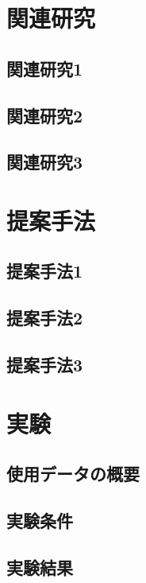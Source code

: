 \documentclass[11pt,a4j]{jreport}
\begin{document}


  \chapter{関連研究}
    \section{関連研究1}
    \section{関連研究2}
    \section{関連研究3}
  \newpage




  \chapter{提案手法}
    \section{提案手法1}
    \section{提案手法2}
    \section{提案手法3}
  \newpage




  \chapter{実験}
    \section{使用データの概要}
    \section{実験条件}
    \section{実験結果}
\end{document}

